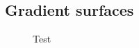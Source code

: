 \documentclass[9pt]{article}
\begin{document}
% 
% 


\subsection{Gradient surfaces}%
\label{sub:gradient_surfaces}
\begin{figure}
  \centering
  
  \caption{Test}%
  \label{fig:test}
\end{figure}



\end{document}
